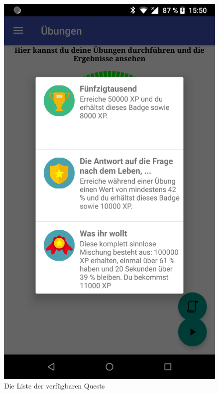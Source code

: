 \begin{multicols}{2}
\begin{figure}[H]
	\includegraphics[scale=0.1]{pics/device-badges.png}
	\caption{Die Liste der verfügbaren Quests}
\end{figure}
\begin{figure}[H]
	\centering

\end{figure}
\end{multicols}
